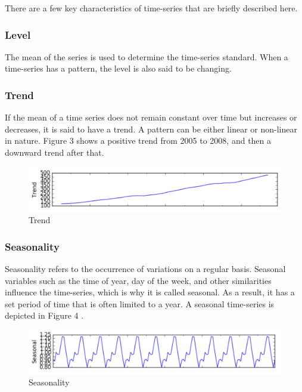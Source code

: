 There are a few key characteristics of time-series that are briefly described here.

\subsubsection{Level}

The mean of the series is used to determine the time-series standard. When a time-series has a pattern, the level is also said to be changing.

\subsubsection{Trend}

If the mean of a time series does not remain constant over time but increases or decreases, it is said to have a trend. A pattern can be either linear or non-linear in nature. Figure 3 shows a positive trend from 2005 to 2008, and then a downward trend after that.

\begin{figure}[h]
	\centering
	\includegraphics[scale=0.3]{Figures/Trend}
	\decoRule
	\caption[Trend]{Trend \parencite{}}
	\label{fig:Trend}
\end{figure}

\subsubsection{Seasonality}

Seasonality refers to the occurrence of variations on a regular basis. Seasonal variables such as the time of year, day of the week, and other similarities influence the time-series, which is why it is called seasonal. As a result, it has a set period of time that is often limited to a year. A seasonal time-series is depicted in Figure 4 \parencite{Braei2020}.

\begin{figure}[h]
	\centering
	\includegraphics[scale=0.3]{Figures/Seasonal}
	\decoRule
	\caption[Seasonality]{Seasonality \parencite{}}
	\label{fig:Seasonality}
\end{figure}

